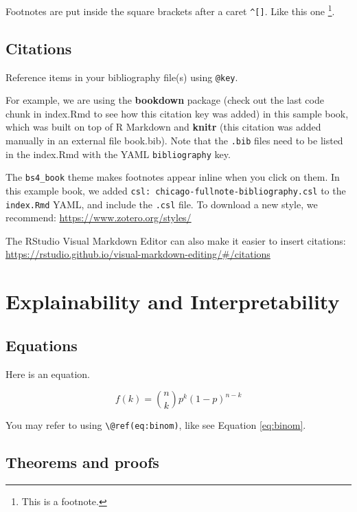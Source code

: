 \documentclass[
]{book}
\theoremstyle{definition}
\theoremstyle{definition}
\theoremstyle{definition}
\theoremstyle{definition}
\theoremstyle{remark}
\begin{document}
Footnotes are put inside the square brackets after a caret \texttt{\^{}{[}{]}}. Like this one \footnote{This is a footnote.}.

\hypertarget{citations}{%
\section{Citations}\label{citations}}

Reference items in your bibliography file(s) using \texttt{@key}.

For example, we are using the \textbf{bookdown} package \citep{R-bookdown} (check out the last code chunk in index.Rmd to see how this citation key was added) in this sample book, which was built on top of R Markdown and \textbf{knitr} \citep{xie2015} (this citation was added manually in an external file book.bib).
Note that the \texttt{.bib} files need to be listed in the index.Rmd with the YAML \texttt{bibliography} key.

The \texttt{bs4\_book} theme makes footnotes appear inline when you click on them. In this example book, we added \texttt{csl:\ chicago-fullnote-bibliography.csl} to the \texttt{index.Rmd} YAML, and include the \texttt{.csl} file. To download a new style, we recommend: \url{https://www.zotero.org/styles/}

The RStudio Visual Markdown Editor can also make it easier to insert citations: \url{https://rstudio.github.io/visual-markdown-editing/\#/citations}

\hypertarget{ch-explainability}{%
\chapter{Explainability and Interpretability}\label{ch-explainability}}

\hypertarget{equations}{%
\section{Equations}\label{equations}}

Here is an equation.

\begin{equation} 
  f\left(k\right) = \binom{n}{k} p^k\left(1-p\right)^{n-k}
  \label{eq:binom}
\end{equation}

You may refer to using \texttt{\textbackslash{}@ref(eq:binom)}, like see Equation \eqref{eq:binom}.

\hypertarget{theorems-and-proofs}{%
\section{Theorems and proofs}\label{theorems-and-proofs}}
\end{document}
